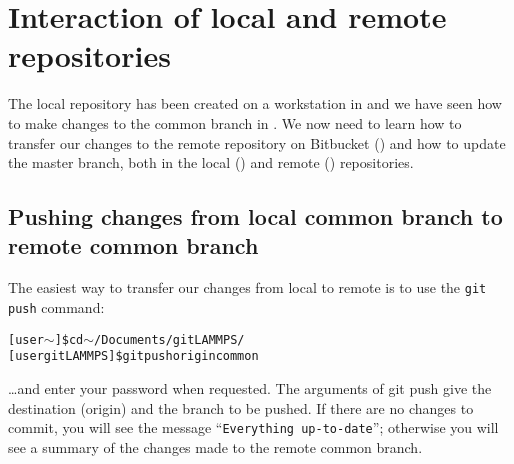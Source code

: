 \documentclass[a4paper,oneside,11pt]{article}
\begin{document}
\section{Interaction of local and remote repositories}\label{sec:ilrr}
The local repository has been created on a workstation in  and we have seen how to make changes to the common branch in . We now need to learn how to transfer our changes to the remote repository on Bitbucket () and how to update the master branch, both in the local () and remote () repositories.

\subsection{Pushing changes from local common branch to remote common branch}\label{ssec:pclcrc}
The easiest way to transfer our changes from local to remote is to use the \texttt{git push} command:
\begin{alltt}
[user \(\sim\)]\$ cd \(\sim\)/Documents/gitLAMMPS/
[user gitLAMMPS]\$ git push origin common
\end{alltt}
\ldots and enter your password when requested. The arguments of git push give the destination (origin) and the branch to be pushed. If there are no changes to commit, you will see the message ``\texttt{Everything up-to-date}''; otherwise you will see a summary of the changes made to the remote common branch.
\end{document}
